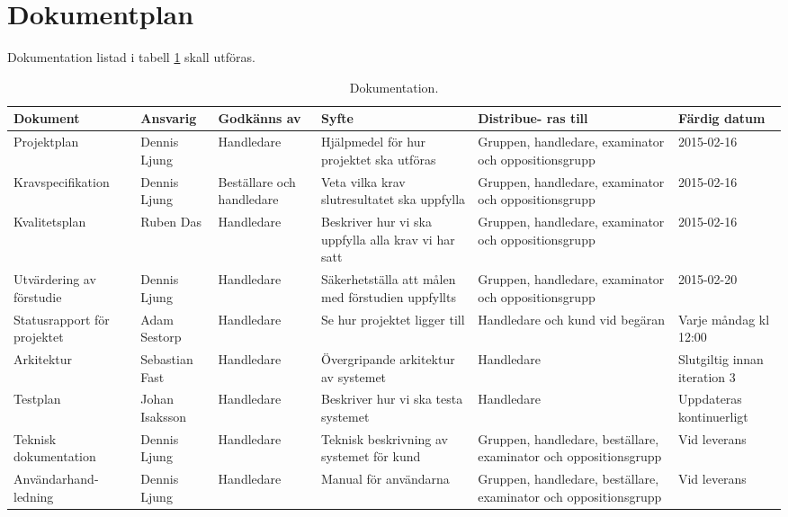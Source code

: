 \section{Dokumentplan}
Dokumentation listad i tabell \ref{dokumentation:tabell} skall utföras.

\begin{table}[H]
	\centering
		\begin{tabularx}{\textwidth}{| p{20mm} | l | X | p{20mm} | X | X |}
			\hline
			\textbf{Dokument} & \textbf{Ansvarig} & \textbf{Godkänns av} & \textbf{Syfte} & \textbf{Distribue-
  ras till} & \textbf{Färdig datum} \\\hline

    		
			{Projektplan} & {Dennis Ljung} & {Handledare} & {Hjälpmedel för hur projektet ska utföras} & {Gruppen, handledare, examinator och oppositionsgrupp} & {2015-02-16} \\\hline
			
			{Kravspecifikation} & {Dennis Ljung} & {Beställare och handledare} & {Veta vilka krav slutresultatet ska uppfylla} & {Gruppen, handledare, examinator och oppositionsgrupp} & {2015-02-16} \\\hline
			
			{Kvalitetsplan} & {Ruben Das} & {Handledare} & {Beskriver hur vi ska uppfylla alla krav vi har satt} & {Gruppen, handledare, examinator och oppositionsgrupp} & {2015-02-16} \\\hline
			
						{Utvärdering av förstudie} & {Dennis Ljung} & {Handledare} & {Säkerhetställa att målen med förstudien uppfyllts} & {Gruppen, handledare, examinator och oppositionsgrupp} & {2015-02-20} \\\hline
			
			{Statusrapport för projektet} & {Adam Sestorp} & {Handledare} & {Se hur projektet ligger till} & {Handledare och kund vid begäran} & {Varje måndag kl 12:00} \\\hline
			
            {Arkitektur} & {Sebastian Fast} & {Handledare} & {Övergripande arkitektur av systemet} & {Handledare} & {Slutgiltig innan iteration 3} \\\hline
               {Testplan} & {Johan Isaksson} & {Handledare} & {Beskriver hur vi ska testa systemet} & {Handledare} & {Uppdateras kontinuerligt} \\\hline

          {Teknisk dokumentation} & {Dennis Ljung} & {Handledare} & {Teknisk beskrivning av systemet för kund} & {Gruppen, handledare, beställare, examinator och oppositionsgrupp} & {Vid leverans} \\\hline			
			
            {Användarhand-ledning} & {Dennis Ljung} & {Handledare} & {Manual för användarna} & {Gruppen, handledare, beställare, examinator och oppositionsgrupp} & {Vid leverans} \\\hline
            
			
			
		\end{tabularx}
	\caption{Dokumentation.} \label{dokumentation:tabell}
\end{table}
